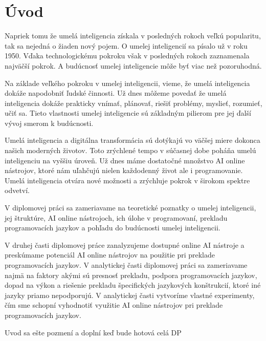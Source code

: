 
{}

\chapter*{Úvod}

Napriek tomu že umelá inteligencia získala v posledných rokoch veľkú popularitu, tak sa nejedná o žiaden nový pojem. O umelej inteligencií sa písalo už v roku 1950. Vďaka technologickému pokroku však v posledných rokoch zaznamenala najväčší pokrok. A budúcnosť umelej inteligencie môže byť viac než pozoruhodná. 
\par Na základe veľkého pokroku v umelej inteligencii, vieme, že umelá inteligencia dokáže napodobniť ľudské činnosti. Už dnes môžeme povedať že umelá inteligencia dokáže prakticky vnímať, plánovať, riešiť problémy, myslieť, rozumieť, učiť sa. Tieto vlastnosti umelej inteligencie sú základným pilierom pre jej ďalší vývoj smerom k budúcnosti.
\par Umelá inteligencia a digitálna transformácia sú dotýkajú vo väčšej miere dokonca našich moderných životov. Toto zrýchlené tempo v súčasnej dobe poháňa umelú inteligenciu na vyššiu úroveň. Už dnes máme dostatočné množstvo AI online nástrojov, ktoré nám uľahčujú nielen každodenný život ale i programovanie.
 Umelá inteligencia otvára nové možnosti a zrýchluje pokrok v širokom spektre odvetví.
\par V diplomovej práci sa zameriavame na teoretické poznatky o umelej inteligencii, jej štruktúre, AI online nástrojoch, ich úlohe v programovaní, prekladu programovacích jazykov a pohľadu do budúcnosti umelej inteligencii. 
\par V druhej časti diplomovej práce zanalyzujeme dostupné online AI nástroje a preskúmame potenciál AI online nástrojov na použitie pri preklade programovacích jazykov. V analytickej časti diplomovej práci sa zameriavame najmä na faktory akými sú presnosť prekladu, podpora programovacích jazykov, dopad na výkon a riešenie prekladu špecifických jazykových konštrukcií, ktoré iné jazyky priamo nepodporujú. V analytickej časti vytvoríme vlastné experimenty, čím sme schopní vyhodnotiť využitie AI online nástrojov pri preklade programovacích jazykov.

Uvod sa ešte pozmení a doplní keď bude hotová celá DP



